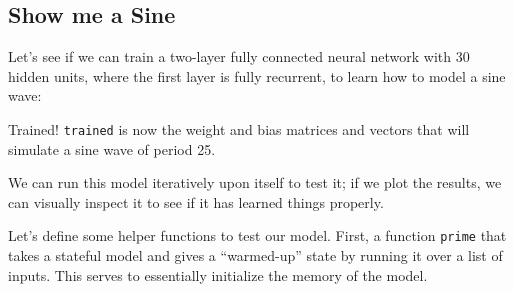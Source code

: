 \documentclass[]{article}
\newenvironment{Shaded}{}{}
\newcommand{\CommentTok}[1]{\textcolor[rgb]{0.38,0.63,0.69}{\textit{#1}}}
\newcommand{\DataTypeTok}[1]{\textcolor[rgb]{0.56,0.13,0.00}{#1}}
\newcommand{\DecValTok}[1]{\textcolor[rgb]{0.25,0.63,0.44}{#1}}
\newcommand{\FunctionTok}[1]{\textcolor[rgb]{0.02,0.16,0.49}{#1}}
\newcommand{\KeywordTok}[1]{\textcolor[rgb]{0.00,0.44,0.13}{\textbf{#1}}}
\newcommand{\NormalTok}[1]{#1}
\newcommand{\OtherTok}[1]{\textcolor[rgb]{0.00,0.44,0.13}{#1}}
\begin{document}
\hypertarget{show-me-a-sine}{%
\subsection{Show me a Sine}\label{show-me-a-sine}}

Let's see if we can train a two-layer fully connected neural network with 30
hidden units, where the first layer is fully recurrent, to learn how to model a
sine wave:

\begin{Shaded}
\end{Shaded}

Trained! \texttt{trained} is now the weight and bias matrices and vectors that
will simulate a sine wave of period 25.

We can run this model iteratively upon itself to test it; if we plot the
results, we can visually inspect it to see if it has learned things properly.

Let's define some helper functions to test our model. First, a function
\texttt{prime} that takes a stateful model and gives a ``warmed-up'' state by
running it over a list of inputs. This serves to essentially initialize the
memory of the model.
\end{document}

